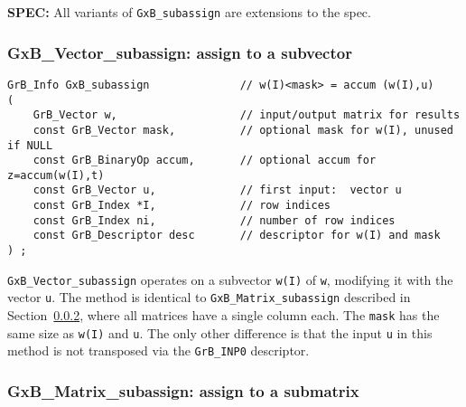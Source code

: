 \documentclass[12pt]{article}
\begin{document}
\begin{spec}
{\bf SPEC:} All variants of \verb'GxB_subassign' are extensions to the spec.
\end{spec}

\subsubsection{{\sf GxB\_Vector\_subassign:} assign to a subvector }
\label{subassign_vector}

\begin{mdframed}[userdefinedwidth=6in]
{\footnotesize
\begin{verbatim}
GrB_Info GxB_subassign              // w(I)<mask> = accum (w(I),u)
(
    GrB_Vector w,                   // input/output matrix for results
    const GrB_Vector mask,          // optional mask for w(I), unused if NULL
    const GrB_BinaryOp accum,       // optional accum for z=accum(w(I),t)
    const GrB_Vector u,             // first input:  vector u
    const GrB_Index *I,             // row indices
    const GrB_Index ni,             // number of row indices
    const GrB_Descriptor desc       // descriptor for w(I) and mask
) ;
\end{verbatim} } \end{mdframed}

\verb'GxB_Vector_subassign' operates on a subvector \verb'w(I)' of \verb'w',
modifying it with the vector \verb'u'.  The method is identical to
\verb'GxB_Matrix_subassign' described in Section~\ref{subassign_matrix}, where
all matrices have a single column each.  The \verb'mask' has the same size as
\verb'w(I)' and \verb'u'.  The only other difference is that the input \verb'u'
in this method is not transposed via the \verb'GrB_INP0' descriptor.

\newpage
\subsubsection{{\sf GxB\_Matrix\_subassign:} assign to a submatrix }
\label{subassign_matrix}
\end{document}

